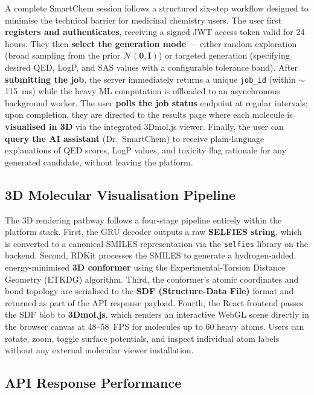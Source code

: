\documentclass[12pt,a4paper]{report}
\begin{document}
A complete SmartChem session follows a structured six-step workflow designed to minimise the technical barrier for medicinal chemistry users. The user first \textbf{registers and authenticates}, receiving a signed JWT access token valid for 24 hours. They then \textbf{select the generation mode} — either random exploration (broad sampling from the prior $\mathcal{N}(\mathbf{0},\mathbf{I})$) or targeted generation (specifying desired QED, LogP, and SAS values with a configurable tolerance band). After \textbf{submitting the job}, the server immediately returns a unique \texttt{job\_id} (within $\sim$115~ms) while the heavy ML computation is offloaded to an asynchronous background worker. The user \textbf{polls the job status} endpoint at regular intervals; upon completion, they are directed to the results page where each molecule is \textbf{visualised in 3D} via the integrated 3Dmol.js viewer. Finally, the user can \textbf{query the AI assistant} (Dr.\ SmartChem) to receive plain-language explanations of QED scores, LogP values, and toxicity flag rationale for any generated candidate, without leaving the platform.

\subsection{3D Molecular Visualisation Pipeline}

The 3D rendering pathway follows a four-stage pipeline entirely within the platform stack. First, the GRU decoder outputs a raw \textbf{SELFIES string}, which is converted to a canonical SMILES representation via the \texttt{selfies} library on the backend. Second, RDKit processes the SMILES to generate a hydrogen-added, energy-minimised \textbf{3D conformer} using the Experimental-Torsion Distance Geometry (ETKDG) algorithm. Third, the conformer's atomic coordinates and bond topology are serialised to the \textbf{SDF (Structure-Data File)} format and returned as part of the API response payload. Fourth, the React frontend passes the SDF blob to \textbf{3Dmol.js}, which renders an interactive WebGL scene directly in the browser canvas at 48--58~FPS for molecules up to 60 heavy atoms. Users can rotate, zoom, toggle surface potentials, and inspect individual atom labels without any external molecular viewer installation.

\subsection{API Response Performance}
\end{document}
